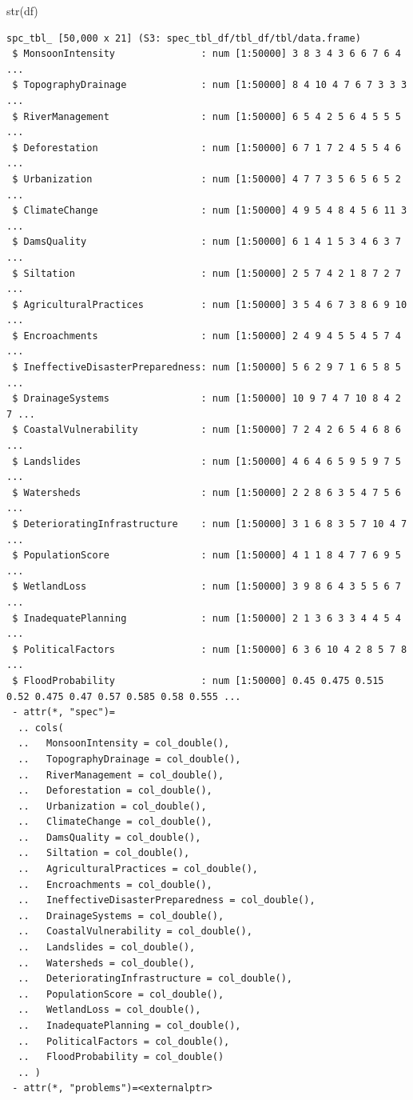 \documentclass[
  letterpaper,
  DIV=11,
  numbers=noendperiod]{scrartcl}
\newenvironment{Shaded}{\begin{snugshade}}{\end{snugshade}}
\newcommand{\FunctionTok}[1]{\textcolor[rgb]{0.28,0.35,0.67}{#1}}
\newcommand{\NormalTok}[1]{\textcolor[rgb]{0.00,0.23,0.31}{#1}}
\begin{document}
\begin{Shaded}
\begin{Highlighting}[]
\FunctionTok{str}\NormalTok{(df)}
\end{Highlighting}
\end{Shaded}

\begin{verbatim}
spc_tbl_ [50,000 x 21] (S3: spec_tbl_df/tbl_df/tbl/data.frame)
 $ MonsoonIntensity               : num [1:50000] 3 8 3 4 3 6 6 7 6 4 ...
 $ TopographyDrainage             : num [1:50000] 8 4 10 4 7 6 7 3 3 3 ...
 $ RiverManagement                : num [1:50000] 6 5 4 2 5 6 4 5 5 5 ...
 $ Deforestation                  : num [1:50000] 6 7 1 7 2 4 5 5 4 6 ...
 $ Urbanization                   : num [1:50000] 4 7 7 3 5 6 5 6 5 2 ...
 $ ClimateChange                  : num [1:50000] 4 9 5 4 8 4 5 6 11 3 ...
 $ DamsQuality                    : num [1:50000] 6 1 4 1 5 3 4 6 3 7 ...
 $ Siltation                      : num [1:50000] 2 5 7 4 2 1 8 7 2 7 ...
 $ AgriculturalPractices          : num [1:50000] 3 5 4 6 7 3 8 6 9 10 ...
 $ Encroachments                  : num [1:50000] 2 4 9 4 5 5 4 5 7 4 ...
 $ IneffectiveDisasterPreparedness: num [1:50000] 5 6 2 9 7 1 6 5 8 5 ...
 $ DrainageSystems                : num [1:50000] 10 9 7 4 7 10 8 4 2 7 ...
 $ CoastalVulnerability           : num [1:50000] 7 2 4 2 6 5 4 6 8 6 ...
 $ Landslides                     : num [1:50000] 4 6 4 6 5 9 5 9 7 5 ...
 $ Watersheds                     : num [1:50000] 2 2 8 6 3 5 4 7 5 6 ...
 $ DeterioratingInfrastructure    : num [1:50000] 3 1 6 8 3 5 7 10 4 7 ...
 $ PopulationScore                : num [1:50000] 4 1 1 8 4 7 7 6 9 5 ...
 $ WetlandLoss                    : num [1:50000] 3 9 8 6 4 3 5 5 6 7 ...
 $ InadequatePlanning             : num [1:50000] 2 1 3 6 3 3 4 4 5 4 ...
 $ PoliticalFactors               : num [1:50000] 6 3 6 10 4 2 8 5 7 8 ...
 $ FloodProbability               : num [1:50000] 0.45 0.475 0.515 0.52 0.475 0.47 0.57 0.585 0.58 0.555 ...
 - attr(*, "spec")=
  .. cols(
  ..   MonsoonIntensity = col_double(),
  ..   TopographyDrainage = col_double(),
  ..   RiverManagement = col_double(),
  ..   Deforestation = col_double(),
  ..   Urbanization = col_double(),
  ..   ClimateChange = col_double(),
  ..   DamsQuality = col_double(),
  ..   Siltation = col_double(),
  ..   AgriculturalPractices = col_double(),
  ..   Encroachments = col_double(),
  ..   IneffectiveDisasterPreparedness = col_double(),
  ..   DrainageSystems = col_double(),
  ..   CoastalVulnerability = col_double(),
  ..   Landslides = col_double(),
  ..   Watersheds = col_double(),
  ..   DeterioratingInfrastructure = col_double(),
  ..   PopulationScore = col_double(),
  ..   WetlandLoss = col_double(),
  ..   InadequatePlanning = col_double(),
  ..   PoliticalFactors = col_double(),
  ..   FloodProbability = col_double()
  .. )
 - attr(*, "problems")=<externalptr> 
\end{verbatim}
\end{document}
